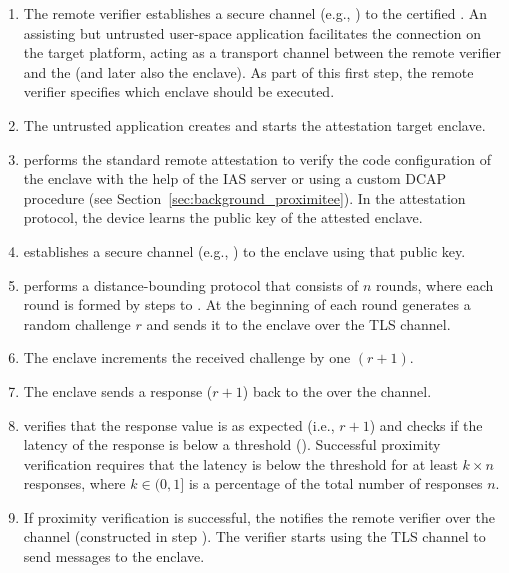\begin{enumerate}%
 
  \item[\one] The remote verifier establishes a secure channel (e.g., \tls) to the certified \device. An assisting but untrusted user-space application facilitates the connection on the target platform, acting as a transport channel between the remote verifier and the \device (and later also the enclave). As part of this first step, the remote verifier specifies which enclave should be executed.%

  \item[\two] The untrusted application creates and starts the attestation target enclave.%

  \item[\three] \device performs the standard remote attestation to verify the code configuration of the enclave with the help of the IAS server or using a custom DCAP procedure (see Section~\ref{sec:background_proximitee}). In the attestation protocol, the device learns the public key of the attested enclave.%

  \item[\four] \device establishes a secure channel (e.g., \tls) to the enclave using that public key.

  \item[\five] \device performs a distance-bounding protocol that consists of $n$ rounds, where each round is formed by steps \five to \eight.
  At the beginning of each round \device generates a random challenge $r$ and sends it to the enclave over the TLS channel.

  \item[\six] The enclave increments the received challenge by one $(r+1)$.

  \item[\seven] The enclave sends a response ($r+1$) back to the \device over the \tls channel.

  \item[\eight] \device verifies that the response value is as expected (i.e., $r+1$) and checks if the latency of the response is below a threshold (\connect). Successful proximity verification requires that the latency is below the threshold for at least $k \times n$ responses, where $k \in (0, 1]$ is a percentage of the total number of responses $n$.

  \item[\nine] If proximity verification is successful, the \device notifies the remote verifier over the \tls channel (constructed in step \one). The verifier starts using the \device TLS channel to send messages to the enclave.
\end{enumerate}


